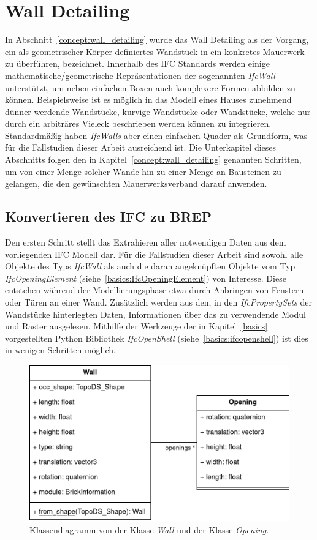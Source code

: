 \section{Wall Detailing}
In Abschnitt~\ref{concept:wall_detailing} wurde das Wall Detailing als der Vorgang, ein als geometrischer Körper definiertes Wandstück in ein konkretes Mauerwerk zu überführen, bezeichnet.
Innerhalb des IFC Standards werden einige mathematische/geometrische Repräsentationen der sogenannten \textit{IfcWall} unterstützt, um neben einfachen Boxen auch komplexere Formen abbilden zu können.
Beispielsweise ist es möglich in das Modell eines Hauses zunehmend dünner werdende Wandstücke, kurvige Wandstücke oder Wandstücke, welche nur durch ein arbiträres Vieleck beschrieben werden können zu integrieren.
Standardmäßig haben \textit{IfcWalls} aber einen einfachen Quader als Grundform, was für die Fallstudien dieser Arbeit ausreichend ist.
Die Unterkapitel dieses Abschnitts folgen den in Kapitel~\ref{concept:wall_detailing} genannten Schritten, um von einer Menge solcher Wände hin zu einer Menge an Bausteinen zu gelangen, die den gewünschten Mauerwerksverband darauf anwenden.

\subsection{Konvertieren des IFC zu BREP}
Den ersten Schritt stellt das Extrahieren aller notwendigen Daten aus dem vorliegenden IFC Modell dar.
Für die Fallstudien dieser Arbeit sind sowohl alle Objekte des Typs \textit{IfcWall} als auch die daran angeknüpften Objekte vom Typ \textit{IfcOpeningElement} (siehe~\ref{basics:IfcOpeningElement}) von Interesse.
Diese entstehen während der Modellierungsphase etwa durch Anbringen von Fenstern oder Türen an einer Wand.
Zusätzlich werden aus den, in den \textit{IfcPropertySets} der Wandstücke hinterlegten Daten, Informationen über das zu verwendende Modul und Raster ausgelesen.
Mithilfe der Werkzeuge der in Kapitel~\ref{basics} vorgestellten Python Bibliothek \textit{IfcOpenShell} (siehe~\ref{basics:ifcopenshell}) ist dies in wenigen Schritten möglich.
\begin{figure}[htb]
  \centering
  \includegraphics[width=0.8\columnwidth]{fig/klassendiagramm_ifc_to_wall.drawio.png}
  \caption{Klassendiagramm von der Klasse \textit{Wall} und der Klasse \textit{Opening}.}\label{fig:real:ifc_to_wall}
\end{figure}

